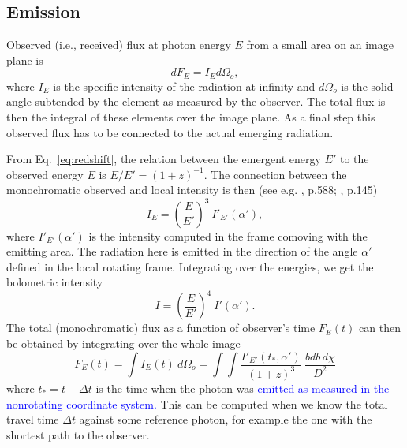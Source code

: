 \documentclass{aa}
\newcommand{\be}{\begin{equation}}
\newcommand{\ee}{\end{equation}}
\newcommand{\red}[1]{\textcolor{red}{#1}}
\newcommand{\refe}[1]{\textcolor{blue}{{#1}}}
\newcommand{\refedel}[1]{}
\begin{document}


\subsection{Emission}\label{sect:emission}
Observed (i.e., received) flux at photon energy $E$ from a small area on an image plane is
\be
dF_E = I_E d\Omega_o,
\ee
where $I_E$ is the specific intensity of the radiation at infinity and $d\Omega_o$ is the solid angle subtended by the element as measured by the observer. 
The total flux is then the integral of these elements over the image plane.
As a final step this observed flux has to be connected to the actual emerging radiation.

From Eq.~\eqref{eq:redshift}, the relation between the emergent energy $E'$ to the observed energy $E$ is $E/E' = (1 + z)^{-1}$.
The connection between the monochromatic observed and local intensity is then (see e.g. \citealt{MTW73}, p.588; \citealt{RL79}, p.145)
\be
I_E = \left( \frac{E}{E'} \right)^3 ~I'_{E'}(\alpha'),
\ee
where $I'_{E'}(\alpha')$ is the intensity computed in the frame comoving with the emitting area.
The radiation here is emitted in the direction of the angle $\alpha'$ defined in the local rotating frame.
Integrating over the energies, we get the bolometric intensity
\be
I = \left(\frac{E}{E'} \right)^4 ~I'(\alpha').
\ee
The total (monochromatic) flux as a function of observer's time $F_E(t)$ can then be obtained by integrating over the whole image
\be\label{eq:fluxint}
F_E(t) = \int I_{E}(t) ~d\Omega_o = \int\int \frac{I'_{E'}(t_*, \alpha')}{(1+z)^3}  ~\frac{bdb \, d\chi}{D^2}
\ee
where $t_* = t - \Delta t$ is the time when the photon was \refe{emitted as measured in the nonrotating coordinate system.}
This can be computed when we know the total travel time $\Delta t$ against some reference photon, for example the one with the shortest path to the observer.
\end{document}
